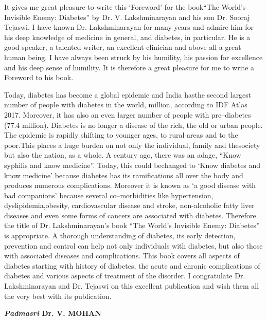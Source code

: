 It gives me great pleasure to write this ‘Foreword’ for the book\break “The World’s Invisible Enemy: Diabetes” by Dr. V. Lakshminara\-yan and his son Dr. Sooraj Tejaswi. I have known Dr. Lakshminarayan for many years and admire him for his deep knowledge of medicine in general, and diabetes, in particular. He is a good speaker, a talented writer, an excellent clinician and above all a great human being. I have always been struck by his humi\-lity, his passion for excellence and his deep sense of humility. It is therefore a great pleasure for me to write a Foreword to his book.

Today, diabetes has become a global epidemic and India has\break the second largest number of people with diabetes in the world, million, according to IDF Atlas 2017. Moreover, it has also an even larger number of people with pre–diabetes (77.4 million). Diabetes is no longer a disease of the rich, the old or urban people. The epidemic is rapidly shifting to younger ages, to rural areas and to the poor.\break This places a huge burden on not only the individual, family and the\break society but also the nation, as a whole. A century ago, there was an adage, “Know syphilis and know medicine”. Today, this could be\break changed to ‘Know diabetes and know medicine’ because diabetes has its ramifications all over the body and produces numerous complications. Moreover it is known as ‘a good di\-sease with bad companions’ because seve\-ral co–morbidities like hypertension, dyslipidemia,\break obesity, cardiovascular disease and stroke, non-alcoholic fatty liver diseases and even some forms of cancers are associated with diabetes. Therefore the title of Dr. Lakshminarayan’s book “The World’s Invisi\-ble Enemy: Diabetes” is appropriate. A thorough understanding of dia\-betes, its early detection, prevention and control can help not only individuals with diabetes, but also those with associated diseases and compli\-cations. This book covers all aspects of diabetes starting with history of diabetes, the acute and chronic complications of diabetes and various aspects of treatment of the disorder. I congra\-tulate Dr. Lakshminarayan and Dr. Tejaswi on this exce\-llent publication and wish them all the very best with its publication.

\begin{flushright}
\textbf{\textit{Padmasri} Dr. V. MOHAN}
\end{flushright}

